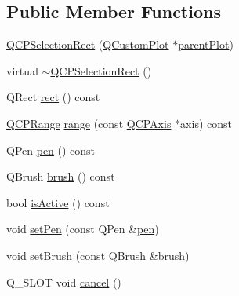 \subsection*{Public Member Functions}
\begin{DoxyCompactItemize}
\item 
\mbox{\hyperlink{class_q_c_p_selection_rect_ade6ee59fabcc585a1e281eb527b01867}{Q\+C\+P\+Selection\+Rect}} (\mbox{\hyperlink{class_q_custom_plot}{Q\+Custom\+Plot}} $\ast$\mbox{\hyperlink{class_q_c_p_layerable_a473edb813a4c1929d6b6a8fe3ff3faf7}{parent\+Plot}})
\item 
virtual \mbox{\hyperlink{class_q_c_p_selection_rect_aded186aabcdc3ee51775b7c5063e199a}{$\sim$\+Q\+C\+P\+Selection\+Rect}} ()
\item 
Q\+Rect \mbox{\hyperlink{class_q_c_p_selection_rect_a3812115ae4dfe2855bf1e58331c14805}{rect}} () const
\item 
\mbox{\hyperlink{class_q_c_p_range}{Q\+C\+P\+Range}} \mbox{\hyperlink{class_q_c_p_selection_rect_a23ab082ffa04be1dbf9afb9e633ab815}{range}} (const \mbox{\hyperlink{class_q_c_p_axis}{Q\+C\+P\+Axis}} $\ast$axis) const
\item 
Q\+Pen \mbox{\hyperlink{class_q_c_p_selection_rect_ab4229f8faeaffba9617d2e6c4779b765}{pen}} () const
\item 
Q\+Brush \mbox{\hyperlink{class_q_c_p_selection_rect_a9669c77c5796dea9dc089a088d50ebfb}{brush}} () const
\item 
bool \mbox{\hyperlink{class_q_c_p_selection_rect_ad27c1569c6ea8fa48e24b81e2a302df3}{is\+Active}} () const
\item 
void \mbox{\hyperlink{class_q_c_p_selection_rect_ada20b7fb1b2dcbe50523262636b06963}{set\+Pen}} (const Q\+Pen \&\mbox{\hyperlink{class_q_c_p_selection_rect_ab4229f8faeaffba9617d2e6c4779b765}{pen}})
\item 
void \mbox{\hyperlink{class_q_c_p_selection_rect_ab0c66f1484418782efa01f4153611080}{set\+Brush}} (const Q\+Brush \&\mbox{\hyperlink{class_q_c_p_selection_rect_a9669c77c5796dea9dc089a088d50ebfb}{brush}})
\item 
Q\+\_\+\+S\+L\+OT void \mbox{\hyperlink{class_q_c_p_selection_rect_af67bc58f4f5ce9a4dc420b9c42de235a}{cancel}} ()
\end{DoxyCompactItemize}

